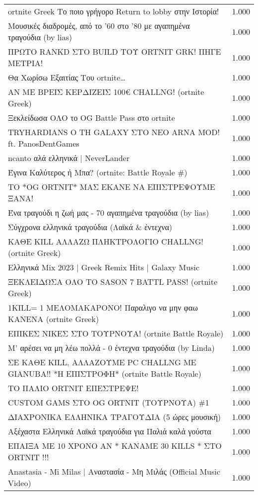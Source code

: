 \begin{table}
\begin{tabular}{|p{10cm}|p{1cm}|}
ortnite Greek Το ποιο γρήγορο Return to lobby στην Ιστορία! & 1.000 \\
Μουσικές διαδρομές, από το '60 στο '80 με αγαπημένα τραγούδια (by lias) & 1.000 \\
ΠΡΩΤΟ RANKD ΣΤΟ BUILD ΤΟΥ ORTNIT GRK! ΠΗΓΕ ΜΕΤΡΙΑ! & 1.000 \\
Θα Χωρίσω Εξαιτίας Του ortnite… & 1.000 \\
ΑΝ ΜΕ ΒΡΕΙΣ ΚΕΡΔΙΖΕΙΣ 100€ CHALLNG! (ortnite Greek) & 1.000 \\
Ξεκλείδωσα ΟΛΟ το OG Battle Pass στο ortnite & 1.000 \\
TRYHARDIANS O TH GALAXY ΣΤΟ ΝΕΟ ARNA MOD! ft. PanosDentGames & 1.000 \\
ncanto αλά ελληνικά | NeverLander & 1.000 \\
Έγινα Καλύτερος ή Μπα? (ortnite: Battle Royale \#) & 1.000 \\
ΤΟ *OG ORTNIT* ΜΑΣ ΕΚΑΝΕ ΝΑ ΕΠΙΣΤΡΕΨΟΥΜΕ ΞΑΝΑ! & 1.000 \\
Ένα τραγούδι η ζωή μας - 70 αγαπημένα τραγούδια (by lias) & 1.000 \\
Σύγχρονα ελληνικά τραγούδια (Λαϊκά \& έντεχνα) & 1.000 \\
ΚΑΘΕ KILL ΑΛΛΑΖΩ ΠΛΗΚΤΡΟΛΟΓΙΟ CHALLNG! (ortnite Greek) & 1.000 \\
Ελληνικά Mix 2023 | Greek Remix Hits | Galaxy Music & 1.000 \\
ΞΕΚΛΕΙΔΩΣΑ ΟΛΟ ΤΟ SASON 7 BATTL PASS! (ortnite Greek) & 1.000 \\
1KILL= 1 ΜΕΛΟΜΑΚΑΡΟΝΟ! Παραλιγο να μην φαω ΚΑΝΕΝΑ  (ortnite Greek) & 1.000 \\
ΕΠΙΚΕΣ ΝΙΚΕΣ ΣΤΟ ΤΟΥΡΝΟΥΑ! (ortnite Battle Royale) & 1.000 \\
Μ' αρέσει να μη λέω πολλά - 0 έντεχνα τραγούδια (by Linda) & 1.000 \\
ΣΕ ΚΑΘΕ KILL, ΑΛΛΑΖΟΥΜΕ PC CHALLNG ΜΕ GIANUBA!! *Η ΕΠΙΣΤΡΟΦΗ* (ortnite Battle Royale) & 1.000 \\
ΤΟ ΠΑΛΙΟ ORTNIT ΕΠΕΣΤΡΕΨΕ! & 1.000 \\
CUSTOM GAMS ΣΤΟ OG ORTNIT (ΤΟΥΡΝΟΥΑ) \#1  & 1.000 \\
ΔΙΑΧΡΟΝΙΚΑ ΕΛΛΗΝΙΚΑ ΤΡΑΓΟΥΔΙΑ (5 ώρες μουσική) & 1.000 \\
Αξέχαστα Ελληνικά Λαϊκά τραγούδια για Παλιά καλά γούστα & 1.000 \\
ΕΠΑΙΞΑ ΜΕ 10 ΧΡΟΝΟ AN * ΚΑΝΑΜΕ 30 KILLS * ΣΤΟ ORTNIT !!! & 1.000 \\
Anastasia - Mi Milas | Αναστασία - Μη Μιλάς (Official Music Video) & 1.000 \\

\end{tabular}
\end{table}
